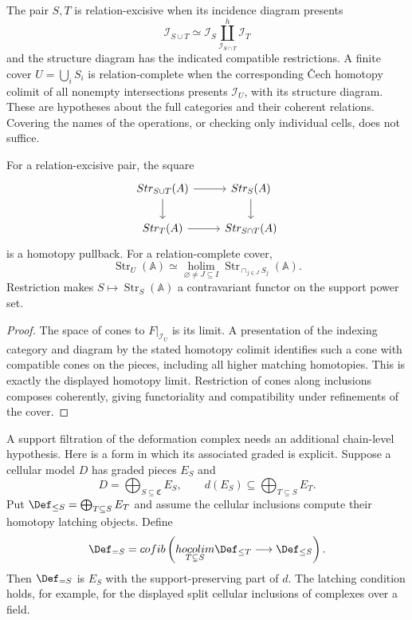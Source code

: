 \begin{definition}
The pair $S,T$ is relation-excisive when its incidence diagram presents
\[
 \mathcal I_{S\cup T}\simeq
 \mathcal I_S\coprod^{h}_{\mathcal I_{S\cap T}}\mathcal I_T
\]
and the structure diagram has the indicated compatible restrictions.
A finite cover $U=\bigcup_iS_i$ is relation-complete when the corresponding
\v{C}ech homotopy colimit of all nonempty intersections presents
$\mathcal I_U$, with its structure diagram. These are hypotheses about
the full categories and their coherent relations. Covering the names of
the operations, or checking only individual cells, does not suffice.
\end{definition}

\begin{theorem}
For a relation-excisive pair, the square
\[
\begin{tikzcd}
 \operatorname{Str}_{S\cup T}(\mathbb A)\arrow[r]\arrow[d]&
 \operatorname{Str}_{S}(\mathbb A)\arrow[d]\\
 \operatorname{Str}_{T}(\mathbb A)\arrow[r]&
 \operatorname{Str}_{S\cap T}(\mathbb A)
\end{tikzcd}
\]
is a homotopy pullback. For a relation-complete cover,
\[
 \operatorname{Str}_U(\mathbb A)\simeq
 \underset{\varnothing\ne J\subseteq I}{\operatorname{holim}}
       \operatorname{Str}_{\cap_{j\in J}S_j}(\mathbb A).
\]
Restriction makes $S\mapsto\operatorname{Str}_S(\mathbb A)$ a
contravariant functor on the support power set.
\end{theorem}
\begin{proof}
The space of cones to $F|_{\mathcal I_U}$ is its limit. A presentation
of the indexing category and diagram by the stated homotopy colimit
identifies such a cone with compatible cones on the pieces, including
all higher matching homotopies. This is exactly the displayed homotopy
limit. Restriction of cones along inclusions composes coherently, giving
functoriality and compatibility under refinements of the cover.
\end{proof}

A support filtration of the deformation complex needs an additional
chain-level hypothesis. Here is a form in which its associated graded is
explicit. Suppose a cellular model $D$ has graded pieces $E_S$ and
\[
 D=\bigoplus_{S\subseteq\mathfrak C}E_S,\qquad
 d(E_S)\subseteq\bigoplus_{T\subseteq S}E_T.
\]
Put $\Def_{\leq S}=\bigoplus_{T\subseteq S}E_T$ and assume the
cellular inclusions compute their homotopy latching objects. Define
\[
 \Def_{=S}=\operatorname{cofib}\left(
  \underset{T\subsetneq S}{\operatorname{hocolim}}\Def_{\leq T}
       \longrightarrow\Def_{\leq S}\right).
\]
Then $\Def_{=S}$ is $E_S$ with the support-preserving part of $d$.
The latching condition holds, for example, for the displayed split
cellular inclusions of complexes over a field.

